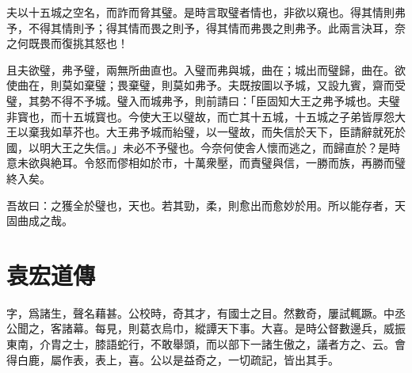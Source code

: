 夫以十五城之空名，而詐而脅其璧。是時言取璧者情也，非欲以窺也。得其情則弗予，不得其情則予；得其情而畏之則予，得其情而弗畏之則弗予。此兩言決耳，奈之何既畏而復挑其怒也！%

且夫欲璧，弗予璧，兩無所曲直也。入璧而弗與城，曲在；城出而璧歸，曲在。欲使曲在，則莫如棄璧；畏棄璧，則莫如弗予。夫既按圖以予城，又設九賓，齋而受璧，其勢不得不予城。璧入而城弗予，則前請曰：「臣固知大王之弗予城也。夫璧非寳也，而十五城寳也。今使大王以璧故，而亡其十五城，十五城之子弟皆厚怨大王以棄我如草芥也。大王弗予城而紿璧，以一璧故，而失信於天下，臣請辭就死於國，以明大王之失信。」未必不予璧也。今奈何使舎人懷而逃之，而歸直於？是時意未欲與絶耳。令怒而僇相如於市，十萬衆壓，而責璧與信，一勝而族，再勝而璧終入矣。 %

吾故曰：之獲全於璧也，天也。若其勁，柔，則愈出而愈妙於用。所以能存者，天固曲成之哉。%

\theendnotes

\section[徐文長傳\quad{\small 袁宏道}]{{\normalsize 袁宏道}\quad {}傳}
字，爲諸生，聲名藉甚。公校時，奇其才，有國士之目。然數奇，屢試輒蹶。中丞公聞之，客諸幕。每見，則葛衣烏巾，縱譚天下事。大喜。是時公督數邊兵，威{振}東南，介胄之士，膝語蛇行，不敢舉頭，而以部下一諸生傲之，議者方之、云。會得白鹿，屬作表，表上，喜。公以是益奇之，一切疏記，皆出其手。%

